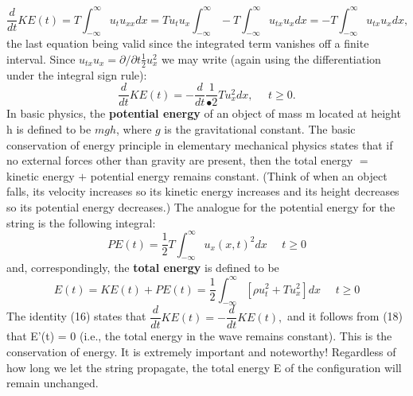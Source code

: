 \documentclass[../main.tex]{subfiles}
\begin{document}
$$
\frac{d}{dt} KE(t)=T \int_{-\infty}^{\infty} u_t u_{xx} dx=Tu_t u_x \int_{-\infty}^{\infty} -T \int_{-\infty}^{\infty} u_{tx} u_x dx =-T \int_{-\infty}^{\infty} u_{tx} u_x dx,
$$
the last equation being valid since the integrated term vanishes off a finite interval. Since $u_{tx} u_x = \partial / \partial t \frac{1}{2} u_x^2$ we may write (again using the differentiation under the 
integral sign rule):
\begin{equation}
\dfrac{d}{dt} KE(t)= -\dfrac{d}{dt}  \dfrac{1}{•2} Tu_{x}^{2} dx, ~~~~~~t\geq 0.
\end{equation}
In basic physics, the \textbf{potential energy} of an object of mass m located at height h is 
defined to be $mgh$, where $g$ is the gravitational constant. The basic conservation of 
energy principle in elementary mechanical physics states that if no external forces 
other than gravity are present, then the total energy $=$ kinetic energy $+$ potential 
energy remains constant. (Think of when an object falls, its velocity increases so 
its kinetic energy increases and its height decreases so its potential energy 
decreases.) The analogue for the potential energy for the string is the following 
integral: 
\begin{equation}
PE(t)=\dfrac{1}{2} T \int_{-\infty}^{\infty} u_x (x,t)^2 dx ~~~~~~t\geq 0
\end{equation}
and, correspondingly, the \textbf{total energy} is defined to be
\begin{equation}
E(t)=KE(t)+PE(t)=\dfrac{1}{2} \int_{-\infty}^{\infty} [\rho u_t^2 + Tu_x^2] dx ~~~~~~t\geq 0
\end{equation}
The identity (16) states that $\dfrac{d}{dt} KE(t)=-\dfrac{d}{dt} KE(t),$ and it follows from (18) that E'(t) = 0 (i.e., the total energy in the wave remains constant). This is the 
conservation of energy. It is extremely important and noteworthy! Regardless of 
how long we let the string propagate, the total energy E of the configuration will 
remain unchanged. 
\\
\\
\end{document}
